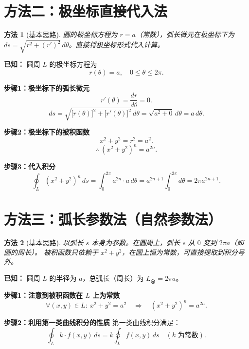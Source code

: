 \documentclass[12pt,a4paper]{ctexart}
\theoremstyle{myremark}
\newtheorem*{method}{方法}
\newcommand{\answerbox}[1]{%
  \begin{center}
  \fbox{\color{red}\large\bfseries #1}
  \end{center}
}
\begin{document}
\section*{\textcolor{blue!70!black}{方法二：极坐标直接代入法}}

\begin{method}[基本思路]
  圆的极坐标方程为 $r=a$（常数），弧长微元在极坐标下为
  $ds = \sqrt{r^2 + (r')^2}\,d\theta$。直接将极坐标形式代入计算。
\end{method}

\medskip
\textbf{已知：} 圆周 $L$ 的极坐标方程为
\[
r(\theta) = a,\quad 0 \leq \theta \leq 2\pi.
\]

\noindent\textbf{步骤1：极坐标下的弧长微元}
\[
r'(\theta) = \frac{dr}{d\theta} = 0.
\]
\[
ds = \sqrt{\big[r(\theta)\big]^2 + \big[r'(\theta)\big]^2}\, d\theta
     = \sqrt{a^2 + 0}\, d\theta
     = a\, d\theta.
\]

\noindent\textbf{步骤2：极坐标下的被积函数}
\[
x^2 + y^2 = r^2 = a^2.
\]
\[
\therefore\ (x^2 + y^2)^n = a^{2n}.
\]

\noindent\textbf{步骤3：代入积分}
\[
\oint_L (x^2 + y^2)^n \, ds
   = \int_0^{2\pi} a^{2n} \cdot a\, d\theta
   = a^{2n+1} \int_0^{2\pi} d\theta
   = 2\pi a^{2n+1}.
\]

\answerbox{$\displaystyle \oint_L (x^2 + y^2)^n \, ds = 2\pi a^{2n+1}$}

\bigskip

\section*{\textcolor{blue!70!black}{方法三：弧长参数法（自然参数法）}}

\begin{method}[基本思路]
  以弧长 $s$ 本身为参数。在圆周上，弧长 $s$ 从 $0$ 变到 $2\pi a$（即圆的周长）。
  被积函数只依赖于 $x^2+y^2$，在圆上恒为常数，可直接提取到积分号外。
\end{method}

\medskip
\textbf{已知：} 圆周 $L$ 的半径为 $a$，总弧长（周长）为 $L_{\text{总}} = 2\pi a$。

\noindent\textbf{步骤1：注意到被积函数在 $L$ 上为常数}
\[
\forall (x,y) \in L:\ x^2 + y^2 = a^2 \quad\Longrightarrow\quad (x^2 + y^2)^n = a^{2n}.
\]

\noindent\textbf{步骤2：利用第一类曲线积分的性质}
第一类曲线积分满足：
\[
\oint_L k \cdot f(x,y)\, ds = k \oint_L f(x,y)\, ds \quad (k\text{ 为常数}).
\]
\end{document}
